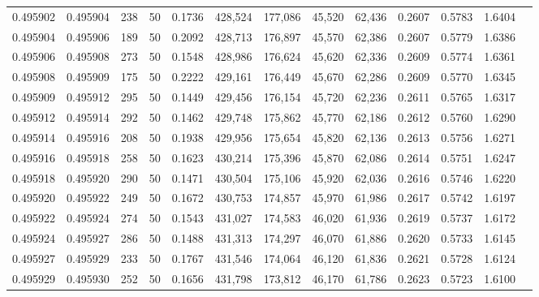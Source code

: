 \begin{tabular}{rrrrrrrrrrrrr}
0.495902 & 0.495904 &   238 &  50 &                                     0.1736 & 428,524 & 177,086 &  45,520 &  62,436 & 0.2607 & 0.5783 & 1.6404 \\
0.495904 & 0.495906 &   189 &  50 &                                     0.2092 & 428,713 & 176,897 &  45,570 &  62,386 & 0.2607 & 0.5779 & 1.6386 \\
0.495906 & 0.495908 &   273 &  50 &                                     0.1548 & 428,986 & 176,624 &  45,620 &  62,336 & 0.2609 & 0.5774 & 1.6361 \\
0.495908 & 0.495909 &   175 &  50 &                                     0.2222 & 429,161 & 176,449 &  45,670 &  62,286 & 0.2609 & 0.5770 & 1.6345 \\
0.495909 & 0.495912 &   295 &  50 &                                     0.1449 & 429,456 & 176,154 &  45,720 &  62,236 & 0.2611 & 0.5765 & 1.6317 \\
0.495912 & 0.495914 &   292 &  50 &                                     0.1462 & 429,748 & 175,862 &  45,770 &  62,186 & 0.2612 & 0.5760 & 1.6290 \\
0.495914 & 0.495916 &   208 &  50 &                                     0.1938 & 429,956 & 175,654 &  45,820 &  62,136 & 0.2613 & 0.5756 & 1.6271 \\
0.495916 & 0.495918 &   258 &  50 &                                     0.1623 & 430,214 & 175,396 &  45,870 &  62,086 & 0.2614 & 0.5751 & 1.6247 \\
0.495918 & 0.495920 &   290 &  50 &                                     0.1471 & 430,504 & 175,106 &  45,920 &  62,036 & 0.2616 & 0.5746 & 1.6220 \\
0.495920 & 0.495922 &   249 &  50 &                                     0.1672 & 430,753 & 174,857 &  45,970 &  61,986 & 0.2617 & 0.5742 & 1.6197 \\
0.495922 & 0.495924 &   274 &  50 &                                     0.1543 & 431,027 & 174,583 &  46,020 &  61,936 & 0.2619 & 0.5737 & 1.6172 \\
0.495924 & 0.495927 &   286 &  50 &                                     0.1488 & 431,313 & 174,297 &  46,070 &  61,886 & 0.2620 & 0.5733 & 1.6145 \\
0.495927 & 0.495929 &   233 &  50 &                                     0.1767 & 431,546 & 174,064 &  46,120 &  61,836 & 0.2621 & 0.5728 & 1.6124 \\
0.495929 & 0.495930 &   252 &  50 &                                     0.1656 & 431,798 & 173,812 &  46,170 &  61,786 & 0.2623 & 0.5723 & 1.6100 \\

\end{tabular}
